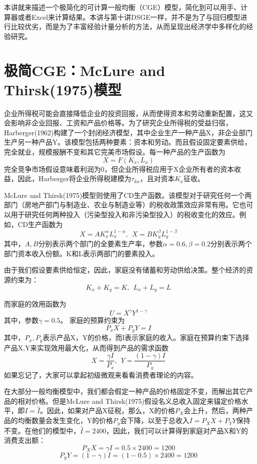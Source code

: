 \documentclass[cn,12pt,math=newtx,citestyle=gb7714-2015,bibstyle=gb7714-2015]{elegantbook}
\begin{document}
	本讲就来描述一个极简化的可计算一般均衡（CGE）模型，简化到可以用手、计算器或者Excel来计算结果。本讲与第十讲DSGE一样，并不是为了与回归模型进行比较优劣，而是为了丰富经验计量分析的方法，从而呈现出经济学中多样化的经验研究。
	
	\section{极简CGE：McLure and Thirsk(1975)模型}
	企业所得税可能会直接降低企业的投资回报，从而使得资本和劳动重新配置，这又会影响非企业回报、工资和产品价格等。为了研究企业所得税的受益归宿，Harberger(1962)构建了一个封闭经济模型，其中企业生产一种产品X，非企业部门生产另一种产品Y。该模型包括两种要素：资本和劳动。而且假设固定要素供给，完全就业，规模报酬不变和其它完美市场假设。每一种产品的生产函数为
	$$X=F(K_x,L_x)$$
	完全竞争市场假设意味着利润为0，但企业所得税应用于X企业所有者的资本收益，因此，Harberger将企业所得税建模为$\tau_{kx}$，且对资本$K_x$征收。
	
	McLure and Thirsk(1975)模型则使用了CD生产函数。该模型对于研究任何一个两部门（房地产部门与制造业、农业与制造业等）的税收政策效应非常有用。它也可以用于研究任何两种投入（污染型投入和非污染型投入）的税收变化的效应。例如，CD生产函数为
	\begin{equation}
		X=AK_x^\alpha L_x^{1-\alpha},~~X=BK_y^\beta L_y^{1-\beta}
	\end{equation}
	其中，$A,B$分别表示两个部门的全要素生产率，参数$\alpha=0.6,\beta=0.2$分别表示两个部门资本收入份额。K和L表示两部门的要素投入。
	
	由于我们假设要素供给恒定，因此，家庭没有储蓄和劳动供给决策。整个经济的资源约束为：
	\begin{equation}
		K_x+K_y=K,~~L_x+L_y=L
	\end{equation}
	
	而家庭的效用函数为
	\begin{equation}
		U=X^\gamma Y^{1-\gamma}
	\end{equation}
	其中，参数$\gamma=0.5$。
	家庭的预算约束为
	\begin{equation}
		P_xX+P_yY=I
	\end{equation}
	其中，$P_x,P_y$表示产品X，Y的价格，而I表示家庭的收入。家庭在预算约束下选择产品X,Y来实现效用最大化，从而得到产品的需求函数
	\begin{equation}
		X=\frac{\gamma I}{P_x},~~Y=\frac{(1-\gamma) I}{P_y}
	\end{equation}
	如果忘记了，大家可以拿起初级微观来看看消费者理论的内容。
	
	在大部分一般均衡模型中，我们都会假定一种产品的价格固定不变，而解出其它产品的相对价格。但是McLure and Thirsk(1975)假设名义总收入固定来锚定价格水平，即$I=\hat{I}$。因此，如果对产品X征税，那么，X的价格$P_X$会上升，然后，两种产品的均衡数量会发生变化，Y的价格$P_y$会下降，以至于总收入$I=P_XX+P_YY$保持不变。在他们的模型中，$\hat{I}=2400$，因此，我们可以计算得到家庭对产品X和Y的消费支出额：
	\begin{equation}
		P_XX=\gamma I=0.5 \times 2400=1200
	\end{equation}
	\begin{equation}
		P_yY=(1-\gamma) I=(1-0.5) \times 2400=1200
	\end{equation}
	
\end{document}
